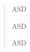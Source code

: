 \vspace*{5cm}
\pagestyle{empty}
\begin{quotation}
\begin{itshape}
ASD
\vspace{2cm}

ASD
\vspace{2cm}

ASD
\end{itshape}
\end{quotation}
